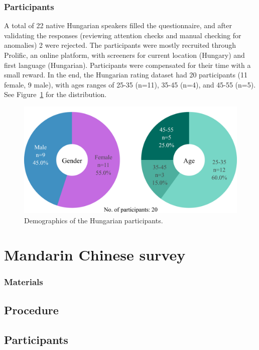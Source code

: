 \documentclass[11pt]{article}
\begin{document}
\subsubsection{Participants}

A total of 22 native Hungarian speakers filled the questionnaire, and after validating the responses (reviewing attention checks and manual checking for anomalies) 2 were rejected. The participants were mostly recruited through Prolific, an online platform, with screeners for current location (Hungary) and first language (Hungarian). Participants were compensated for their time with a small reward. In the end, the Hungarian rating dataset had 20 participants (11 female, 9 male), with ages ranges of 25-35 (n=11), 35-45 (n=4), and 45-55 (n=5). See Figure~\ref{fig:demographics_hu} for the distribution.

\begin{figure}[ht]
  \centering
  \includegraphics[width=\linewidth]{../demographics_hu}
  \caption{Demographics of the Hungarian participants.}
  \label{fig:demographics_hu}
\end{figure}

\section{Mandarin Chinese survey}

\subsubsection{Materials}

\subsection{Procedure}

\subsection{Participants}
\end{document}
